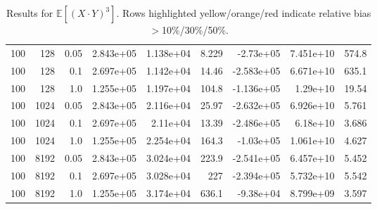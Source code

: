 \documentclass{article}
\begin{document}
\begin{table}[htbp]
\begin{tabular}{rrr|rrrrrr}
\midrule
\rowcolor{red!40}100 & 128 & 0.05 & 2.843e+05 & 1.138e+04 & 8.229 & -2.73e+05 & 7.451e+10 & 574.8 \\
\rowcolor{red!40}100 & 128 & 0.1 & 2.697e+05 & 1.142e+04 & 14.46 & -2.583e+05 & 6.671e+10 & 635.1 \\
\rowcolor{red!40}100 & 128 & 1.0 & 1.255e+05 & 1.197e+04 & 104.8 & -1.136e+05 & 1.29e+10 & 19.54 \\
\midrule
\rowcolor{red!40}100 & 1024 & 0.05 & 2.843e+05 & 2.116e+04 & 25.97 & -2.632e+05 & 6.926e+10 & 5.761 \\
\rowcolor{red!40}100 & 1024 & 0.1 & 2.697e+05 & 2.11e+04 & 13.39 & -2.486e+05 & 6.18e+10 & 3.686 \\
\rowcolor{red!40}100 & 1024 & 1.0 & 1.255e+05 & 2.254e+04 & 164.3 & -1.03e+05 & 1.061e+10 & 4.627 \\
\midrule
\rowcolor{red!40}100 & 8192 & 0.05 & 2.843e+05 & 3.024e+04 & 223.9 & -2.541e+05 & 6.457e+10 & 5.452 \\
\rowcolor{red!40}100 & 8192 & 0.1 & 2.697e+05 & 3.028e+04 & 227 & -2.394e+05 & 5.732e+10 & 5.542 \\
\rowcolor{red!40}100 & 8192 & 1.0 & 1.255e+05 & 3.174e+04 & 636.1 & -9.38e+04 & 8.799e+09 & 3.597 \\
\bottomrule
\end{tabular}
\caption{Results for $\mathbb{E}[(X \cdot Y)^3]$. Rows highlighted yellow/orange/red indicate relative bias $>$10\%/30\%/50\%.}
\label{tab:EZ3}
\end{table}



\end{document}
